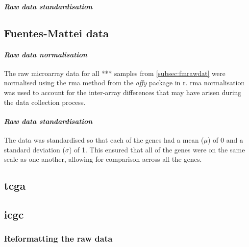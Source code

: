 \paragraph{\textit{ Raw data standardisation }}





\subsection{Fuentes-Mattei data}
\label{subsec:fmdatproc}


\paragraph{\textit{Raw data normalisation}}

The raw microarray data for all *** samples from \cref{subsec:fmrawdat} were normalised using the \gls{rma} method from the \textit{affy} package in \gls{r}.
\gls{rma} normalisation was used to account for the inter-array differences that may have arisen during the data collection process.

\paragraph{\textit{ Raw data standardisation }}

The data was standardised so that each of the genes had a mean ($\mu$) of 0 and a standard deviation ($\sigma$) of 1.
This ensured that all of the genes were on the same scale as one another, allowing for comparison across all the genes.

\subsection{\gls{tcga}}
\label{subsec:datproctcga}




\subsection{\gls{icgc}}
\label{subsec:datprocicgc}

\subsubsection{\textbf{Reformatting the raw data}}
\label{subsec:icgcreformat}

